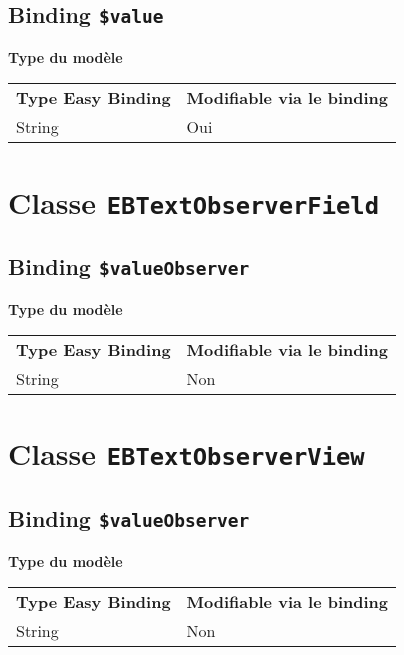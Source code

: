 \subsection{Binding \texttt{\$value}}

{\bf Type du modèle}

\begin{tabular}{ll}
\textbf{Type Easy Binding} & \textbf{Modifiable via le binding}\\
String& Oui\\
\end{tabular}







\section{Classe \texttt{EBTextObserverField}}

\subsection{Binding \texttt{\$valueObserver}}

{\bf Type du modèle}

\begin{tabular}{ll}
\textbf{Type Easy Binding} & \textbf{Modifiable via le binding}\\
String& Non\\
\end{tabular}







\section{Classe \texttt{EBTextObserverView}}

\subsection{Binding \texttt{\$valueObserver}}

{\bf Type du modèle}

\begin{tabular}{ll}
\textbf{Type Easy Binding} & \textbf{Modifiable via le binding}\\
String& Non\\
\end{tabular}







